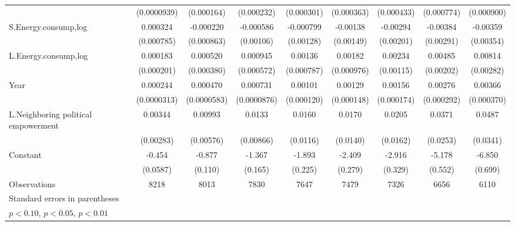 \begin{table}[htbp]
\begin{tabular}{l*{8}{c}}
                    & (0.0000939)         &  (0.000164)         &  (0.000232)         &  (0.000301)         &  (0.000363)         &  (0.000433)         &  (0.000774)         &  (0.000900)         \\
[1em]
S.Energy.consump,log&    0.000324         &   -0.000220         &   -0.000586         &   -0.000799         &    -0.00138         &    -0.00294         &    -0.00384         &    -0.00359         \\
                    &  (0.000785)         &  (0.000863)         &   (0.00106)         &   (0.00128)         &   (0.00149)         &   (0.00201)         &   (0.00291)         &   (0.00354)         \\
[1em]
L.Energy.consump,log&    0.000183         &    0.000520         &    0.000945         &     0.00136\sym{*}  &     0.00182\sym{*}  &     0.00234\sym{**} &     0.00485\sym{**} &     0.00814\sym{***}\\
                    &  (0.000201)         &  (0.000380)         &  (0.000572)         &  (0.000787)         &  (0.000976)         &   (0.00115)         &   (0.00202)         &   (0.00282)         \\
[1em]
Year                &    0.000244\sym{***}&    0.000470\sym{***}&    0.000731\sym{***}&     0.00101\sym{***}&     0.00129\sym{***}&     0.00156\sym{***}&     0.00276\sym{***}&     0.00366\sym{***}\\
                    & (0.0000313)         & (0.0000583)         & (0.0000876)         &  (0.000120)         &  (0.000148)         &  (0.000174)         &  (0.000292)         &  (0.000370)         \\
[1em]
L.Neighboring political empowerment&     0.00344         &     0.00993\sym{*}  &      0.0133         &      0.0160         &      0.0170         &      0.0205         &      0.0371         &      0.0487         \\
                    &   (0.00283)         &   (0.00576)         &   (0.00866)         &    (0.0116)         &    (0.0140)         &    (0.0162)         &    (0.0253)         &    (0.0341)         \\
[1em]
Constant            &      -0.454\sym{***}&      -0.877\sym{***}&      -1.367\sym{***}&      -1.893\sym{***}&      -2.409\sym{***}&      -2.916\sym{***}&      -5.178\sym{***}&      -6.850\sym{***}\\
                    &    (0.0587)         &     (0.110)         &     (0.165)         &     (0.225)         &     (0.279)         &     (0.329)         &     (0.552)         &     (0.699)         \\
\hline
Observations        &        8218         &        8013         &        7830         &        7647         &        7479         &        7326         &        6656         &        6110         \\
\hline\hline
\multicolumn{9}{l}{\footnotesize Standard errors in parentheses}\\
\multicolumn{9}{l}{\footnotesize \sym{*} \(p<0.10\), \sym{**} \(p<0.05\), \sym{***} \(p<0.01\)}\\
\end{tabular}
\end{table}
